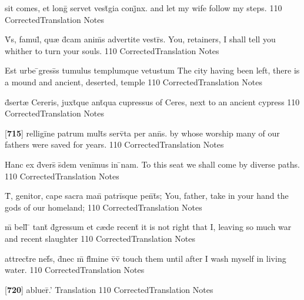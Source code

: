 \latline
  {sit comes, et long\={} servet vest\={\macron {\i}}gia conj\={}nx.}
  { and let my wife follow my steps. }
  {110}
  { CorrectedTranslation }
  { Notes }


\latline
  {V\={}s, famul\={\macron {\i}}, qu{\ae} d\={\macron {\i}}cam anim\={\macron {\i}}s advertite vestr\={\macron {\i}}s.}
  { You, retainers, I shall tell you whither to turn your souls.   }
  {110}
  { CorrectedTranslation }
  { Notes }


\latline
  {Est urbe \={}gress\={\macron {\i}}s tumulus templumque vetustum}
  { The city having been left, there is a mound and ancient, deserted, temple }
  {110}
  { CorrectedTranslation }
  { Notes }


\latline
  {d\={}sert{\ae} Cereris, juxt\={}que ant\={\macron {\i}}qua cupressus}
  { of Ceres, next to an ancient cypress }
  {110}
  { CorrectedTranslation }
  { Notes }


\latline
  {[\textbf{715}] relligi\={}ne patrum mult\={}s serv\={}ta per ann\={}s.}
  { by whose worship many of our fathers were saved for years. }
  {110}
  { CorrectedTranslation }
  { Notes }


\latline
  {Hanc ex d\={\macron {\i}}vers\={} s\={}dem veni\={}mus in \={}nam.}
  { To this seat we shall come by diverse paths. }
  {110}
  { CorrectedTranslation }
  { Notes }


\latline
  {T\={}, genitor, cape sacra man\={} patri\={}sque pen\={}t\={\macron {\i}}s;}
  { You, father, take in your hand the gods of our homeland; }
  {110}
  { CorrectedTranslation }
  { Notes }


\latline
  {m\={} bell\={} \={} tant\={} d\={\macron {\i}}gressum et c{\ae}de recent\={\macron {\i}}}
  { it is not right that I, leaving so much war and recent slaughter }
  {110}
  { CorrectedTranslation }
  { Notes }


\latline
  {attrect\={}re nef\={}s, d\={}nec m\={} fl\={}mine v\={\macron {\i}}v\={}}
  { touch them until after I wash myself in living water. }
  {110}
  { CorrectedTranslation }
  { Notes }


\latline
  {[\textbf{720}] abluer\={}.'}
  { Translation }
  {110}
  { CorrectedTranslation }
  { Notes }


